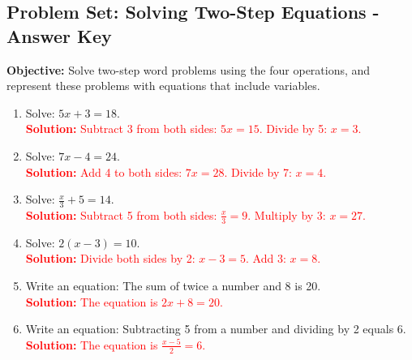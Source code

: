 \documentclass[12pt]{article}
\title{}
\date{}
\begin{document}
\subsection*{Problem Set: Solving Two-Step Equations - Answer Key}
\onehalfspacing

\begin{tcolorbox}[colframe=black!40, colback=gray!5, 
coltitle=black, colbacktitle=black!20, fonttitle=\bfseries\Large, 
title=Learning Objective, halign title=center, left=5pt, right=5pt, top=5pt, bottom=15pt]
\textbf{Objective:} Solve two-step word problems using the four operations, and represent these problems with equations that include variables.
\end{tcolorbox}

\begin{tcolorbox}[colframe=black!60, colback=white, 
coltitle=black, colbacktitle=black!15, fonttitle=\bfseries\Large, 
title=Exercises, halign title=center, left=10pt, right=10pt, top=10pt, bottom=60pt]
\begin{enumerate}[itemsep=3em]
    \item Solve: \( 5x + 3 = 18 \).\\
    \textcolor{red}{\textbf{Solution:} Subtract 3 from both sides: \( 5x = 15 \). Divide by 5: \( x = 3 \).}

    \item Solve: \( 7x - 4 = 24 \).\\
    \textcolor{red}{\textbf{Solution:} Add 4 to both sides: \( 7x = 28 \). Divide by 7: \( x = 4 \).}

    \item Solve: \( \frac{x}{3} + 5 = 14 \).\\
    \textcolor{red}{\textbf{Solution:} Subtract 5 from both sides: \( \frac{x}{3} = 9 \). Multiply by 3: \( x = 27 \).}

    \item Solve: \( 2(x - 3) = 10 \).\\
    \textcolor{red}{\textbf{Solution:} Divide both sides by 2: \( x - 3 = 5 \). Add 3: \( x = 8 \).}

    \item Write an equation: The sum of twice a number and 8 is 20.\\
    \textcolor{red}{\textbf{Solution:} The equation is \( 2x + 8 = 20 \).}

    \item Write an equation: Subtracting 5 from a number and dividing by 2 equals 6.\\
    \textcolor{red}{\textbf{Solution:} The equation is \( \frac{x - 5}{2} = 6 \).}


\end{enumerate}
\end{tcolorbox}
\end{document}
